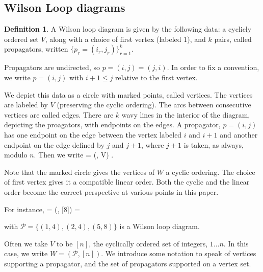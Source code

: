 \documentclass[11pt]{article}
\newcommand{\drawWLD}[2]{

\pgfmathsetmacro{\n}{#1}
\pgfmathsetmacro{\radius}{#2}
\pgfmathsetmacro{\angle}{360/\n}
\draw (0,0) circle (\radius);
    \foreach \i in {1,2,...,\n} {
      \draw (\angle*\i:\radius) node {$\bullet$};
    }

}
\newcommand{\drawprop}[4]{
\pgfmathsetmacro{\r}{#1}
\pgfmathsetmacro{\bumpr}{#2}
\pgfmathsetmacro{\s}{#3}
\pgfmathsetmacro{\bumps}{#4}
\pgfmathsetmacro{\perturbe}{\angle/\n}

\begin{scope}
\draw[propagator] (\angle*\r + \angle/2 + \bumpr*\perturbe:\radius) -- (\angle*\s + \angle/2 + \bumps*\perturbe:\radius);
\end{scope}
}
\newcommand{\drawnumbers}{
  \foreach \i in {1,2,...,\n} {
  \pgfmathsetmacro{\x}{\angle*\i}
  \draw (\x:\radius*1.15) node {\footnotesize \i};
}
}
\def\bas #1\eas{\begin{align*} #1 \end{align*}}
\newcommand{\cP}{\mathcal{P}}
\theoremstyle{remark}
\theoremstyle{definition}
\newtheorem{dfn}[thm]{Definition}
\begin{document}
\subsection{Wilson Loop diagrams}\label{section WLD background}


\begin{dfn}\label{WLdfn}
A Wilson loop diagram is given by the following data: a cyclicly ordered set $V$, along with a choice of first vertex (labeled $1$), and $k$ pairs, called propagators, written $\{p_r = (i_r, j_r)\}_{r=1}^k$.  \end{dfn}

Propagators are undirected, so $p = (i,j) = (j,i)$. In order to fix a convention, we write $p = (i,j)$ with  $i +1 \leq j$ relative to the first vertex.

We depict this data as a circle with marked points, called vertices. The vertices are labeled by $V$ (preserving the cyclic ordering). The arcs between consecutive vertices are called edges. There are $k$ wavy lines in the interior of the diagram, depicting the proagators, with endpoints on the edges. A propagator, $p =(i,j)$ has one endpoint on the edge between the vertex labeled $i$ and $i+1$ and another endpoint on the edge defined by $j$ and $j+1$, where $j+1$ is taken, as always, modulo $n$. Then we write \bas W = (\cP, V) \;.\eas 

Note that the marked circle gives the vertices of $W$ a cyclic ordering. The choice of first vertex gives it a compatible linear order. Both the cyclic and the linear order become the correct perspective at various points in this paper. 

For instance, 
\bas W = (\cP, [8]) =   \eas with $\cP = \{ (1,4), (2, 4), (5, 8)\}$ is a Wilson loop diagram.


Often we take $V$ to be $[n]$, the cyclically ordered set of integers, $1 \ldots n$. In this case, we write $W = (\cP, [n])$. We introduce some notation to speak of vertices supporting a propagator, and the set of propagators supported on a vertex set.
\end{document}
